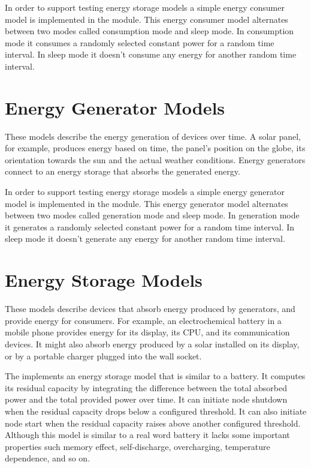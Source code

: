 In order to support testing energy storage models a simple energy consumer model
is implemented in the  module. This energy
consumer model alternates between two modes called consumption mode and sleep
mode. In consumption mode it consumes a randomly selected constant power for a
random time interval. In sleep mode it doesn't consume any energy for another
random time interval.
 
\section{Energy Generator Models}

These models describe the energy generation of devices over time. A solar panel,
for example, produces energy based on time, the panel's position on the globe,
its orientation towards the sun and the actual weather conditions. Energy
generators connect to an energy storage that absorbs the generated energy. 

In order to support testing energy storage models a simple energy generator
model is implemented in the  module.
This energy generator model alternates between two modes called generation mode
and sleep mode. In generation mode it generates a randomly selected constant
power for a random time interval. In sleep mode it doesn't generate any energy
for another random time interval.
 
\section{Energy Storage Models}

These models describe devices that absorb energy produced by generators, and
provide energy for consumers. For example, an electrochemical battery in a
mobile phone provides energy for its display, its CPU, and its communication
devices. It might also absorb energy produced by a solar installed on its
display, or by a portable charger plugged into the wall socket.

The  implements an energy storage model that is
similar to a battery. It computes its residual capacity by integrating the
difference between the total absorbed power and the total provided power over
time. It can initiate node shutdown when the residual capacity drops below a
configured threshold. It can also initiate node start when the residual capacity
raises above another configured threshold. Although this model is similar to a
real word battery it lacks some important properties such memory effect,
self-discharge, overcharging, temperature dependence, and so on.


